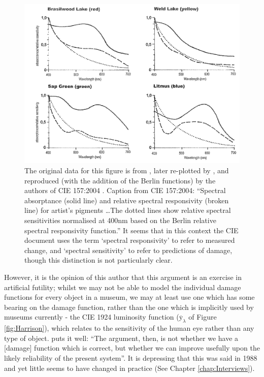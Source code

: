 \begin{figure}[htbp]
\includegraphics[max width=\textwidth]{figs/LitRev/Cuttle.png}
\caption{The original data for this figure is from \citet{saunders_wavelength-dependent_1994}, later re-plotted by \citet{cuttle_control_1999}, and reproduced (with the addition of the Berlin functions) by the authors of \gls{CIE} 157:2004 \citep{cie_cie_2004}. Caption from \gls{CIE} 157:2004: ``Spectral absorptance (solid line) and relative spectral responsivity (broken line) for artist's pigments \dots The dotted lines show relative spectral sensitivities normalised at 400nm based on the Berlin relative spectral responsivity function.'' It seems that in this context the \gls{CIE} document uses the term `spectral responsivity' to refer to measured change, and `spectral sensitivity' to refer to predictions of damage, though this distinction is not particularly clear.}
\label{fig:Cuttle}
\end{figure}

However, it is the opinion of this author that this argument is an exercise in artificial futility; whilst we may not be able to model the individual damage functions for every object in a museum, we may at least use one which has some bearing on the damage function, rather than the one which is implicitly used by museums currently - the \gls{CIE} 1924 luminosity function ($\overline{\mathrm{y}}_{\lambda}$ of Figure \ref{fig:Harrison}), which relates to the sensitivity of the human eye rather than any type of object. \citet{cuttle_lighting_1988} puts it well: ``The argument, then, is not whether we have a [damage] function which is correct, but whether we can improve usefully upon the likely reliability of the present system''. It is depressing that this was said in 1988 and yet little seems to have changed in practice (See Chapter \ref{chap:Interviews}).

